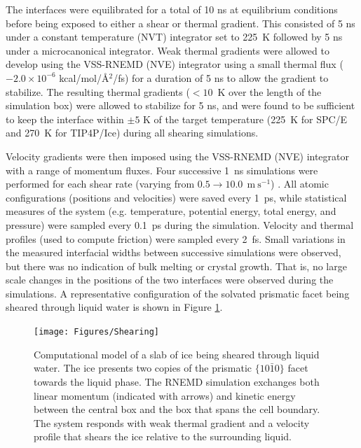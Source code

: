 The interfaces were equilibrated for a total of 10 ns at equilibrium
conditions before being exposed to either a shear or thermal gradient.
This consisted of 5 ns under a constant temperature (NVT) integrator
set to 225~K followed by 5 ns under a microcanonical integrator.  Weak
thermal gradients were allowed to develop using the VSS-RNEMD (NVE)
integrator using a small thermal flux ($-2.0\times 10^{-6}$
kcal/mol/\AA$^2$/fs) for a duration of 5 ns to allow the gradient to
stabilize.  The resulting thermal gradients ($< 10$~K over the length
of the simulation box) were allowed to stabilize for 5 ns, and were
found to be sufficient to keep the interface within $\pm 5$ K of the
target temperature (225~K for SPC/E and 270~K for TIP4P/Ice) during
all shearing simulations.

Velocity gradients were then imposed using the VSS-RNEMD (NVE)
integrator with a range of momentum fluxes.  Four successive 1~ns
simulations were performed for each shear rate (varying from
$0.5 \rightarrow 10.0~\mathrm{~m~s}^{-1}$) . All atomic configurations
(positions and velocities) were saved every 1~ps, while statistical
measures of the system (e.g. temperature, potential energy, total
energy, and pressure) were sampled every 0.1~ps during the
simulation. Velocity and thermal profiles (used to compute friction)
were sampled every 2~fs. Small variations in the measured interfacial
widths between successive simulations were observed, but there was no
indication of bulk melting or crystal growth. That is, no large scale
changes in the positions of the two interfaces were observed during
the simulations.  A representative configuration of the solvated
prismatic facet being sheared through liquid water is shown in Figure
\ref{fig:Shearing}.


\begin{figure} 
\texttt{[image: Figures/Shearing]}
\caption{\label{fig:Shearing} Computational model of a slab of ice
  being sheared through liquid water.  The ice presents two copies of
  the prismatic $\{10\bar{1}0\}$ facet towards the liquid phase.  The
  RNEMD simulation exchanges both linear momentum (indicated with
  arrows) and kinetic energy between the central box and the box that
  spans the cell boundary.  The system responds with weak thermal
  gradient and a velocity profile that shears the ice relative to the
  surrounding liquid.}
\end{figure}